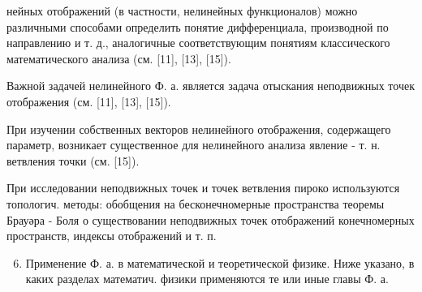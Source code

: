 \documentclass[10pt]{article}
\begin{document}
нейных отображений (в частности, нелинейных функционалов) можно различными способами определить понятие дифференциала, производной по направлению и т. д., аналогичные соответствующим понятиям классического математического анализа (см. [11], [13], [15]).



Важной задачей нелинейного Ф. а. является задача отыскания неподвижных точек отображения (см. [11], [13], [15]).



При изучении собственных векторов нелинейного отображения, содержащего параметр, возникает существенное для нелинейного анализа явление - т. н. ветвления точки (см. [15]).



При исследовании неподвижных точек и точек ветвления пироко используются топологич. методы: обобщения на бесконечномерные пространства теоремы Брауәра - Боля о существовании неподвижных точек отображений конечномерных пространств, индексы отображений и т. п.



\begin{enumerate}

  \setcounter{enumi}{5}

  \item Применение Ф. а. в математической и теоретической физике. Ниже указано, в каких разделах математич. физики применяются те или иные главы Ф. а.

\end{enumerate}
\end{document}
